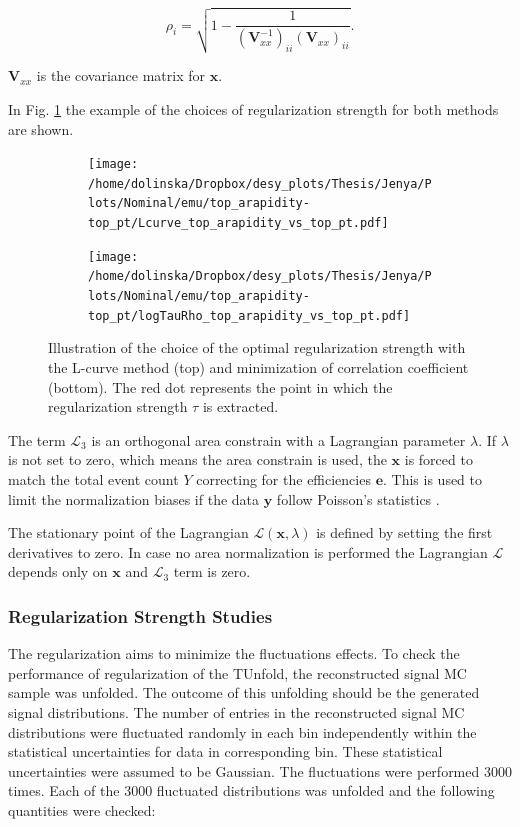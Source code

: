 \begin{equation}
 \rho_{i} = \sqrt{1 - \frac{1}{(\mathbf{V}_{xx}^{-1})_{ii} (\mathbf{V}_{xx})_{ii}}}.
\end{equation}

$\mathbf{V}_{xx}$ is the covariance matrix for $\mathbf{x}$.

In Fig. \ref{fig:reg_s_m} the example of the choices of regularization strength for both methods are shown.

\begin{figure}[p]
\centering
\begin{subfigure}
  \centering
  \texttt{[image: /home/dolinska/Dropbox/desy\_plots/Thesis/Jenya/Plots/Nominal/emu/top\_arapidity-top\_pt/Lcurve\_top\_arapidity\_vs\_top\_pt.pdf]}
\end{subfigure}
\begin{subfigure}
  \centering
  \texttt{[image: /home/dolinska/Dropbox/desy\_plots/Thesis/Jenya/Plots/Nominal/emu/top\_arapidity-top\_pt/logTauRho\_top\_arapidity\_vs\_top\_pt.pdf]}
\end{subfigure}
\caption{Illustration of the choice of the optimal regularization strength with the L-curve method (top) and minimization of correlation coefficient
         (bottom). The red dot represents the point in which the regularization strength $\tau$ is extracted.}
\label{fig:reg_s_m}
\end{figure}

The term $\mathcal{L}_{3}$ is an orthogonal area constrain with a Lagrangian parameter $\lambda$. If $\lambda$ is not set to zero,
which means the area constrain is used, the $\mathbf{x}$ is forced to match the total event count $Y$ correcting for the efficiencies $\mathbf{e}$.
This is used to limit the normalization biases if the data $\mathbf{y}$ follow Poisson's statistics \cite{Cowan98}.

The stationary point of the Lagrangian $\mathcal{L}(\mathbf{x}, \lambda)$ is defined by setting the first derivatives to zero. In case no 
area normalization is performed the Lagrangian $\mathcal{L}$ depends only on $\mathbf{x}$ and $\mathcal{L}_{3}$ term is zero.

\subsubsection{Regularization Strength Studies}

The regularization aims to minimize the fluctuations effects. To check the performance of regularization of the TUnfold, the reconstructed signal
MC sample was unfolded. The outcome of this unfolding should be the generated signal distributions. The number of entries in the reconstructed signal
MC distributions were fluctuated randomly in each bin independently within the statistical uncertainties for data in corresponding bin. 
These statistical uncertainties were assumed to be Gaussian. The fluctuations were performed 3000 times. Each of the 3000 fluctuated distributions 
was unfolded and the following quantities were checked:

